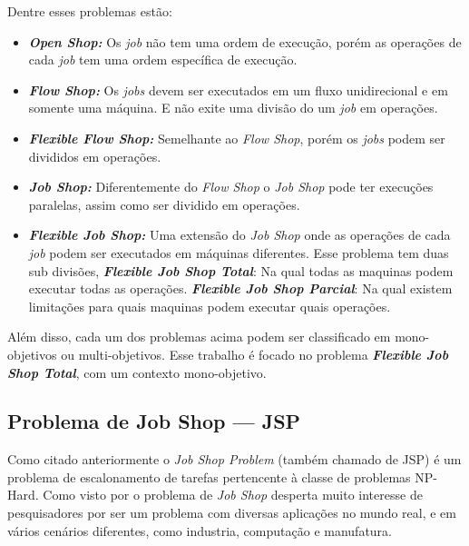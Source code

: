         \noindent Dentre esses problemas estão:
        \begin{itemize}
            \item \textbf{\textit{Open Shop:}} Os \textit{job} não tem uma ordem de execução, porém as operações de cada \textit{job} tem uma ordem específica de execução.
            
            \item \textbf{\textit{Flow Shop:}} Os \textit{jobs} devem ser executados em um fluxo unidirecional e em somente uma máquina. E não exite uma divisão do um \textit{job} em operações.
            
            \item \textbf{\textit{Flexible Flow Shop:}} Semelhante ao \textit{Flow Shop}, porém os \textit{jobs} podem ser divididos em operações.
            
            \item \textbf{\textit{Job Shop:}} Diferentemente do \textit{Flow Shop} o \textit{Job Shop} pode ter execuções paralelas, assim como ser dividido em operações.
            
            \item \textbf{\textit{Flexible Job Shop:}} Uma extensão do \textit{Job Shop} onde as operações de cada \textit{job} podem ser executados em máquinas diferentes. Esse problema tem duas sub divisões, 
            \subitem \textbf{\textit{Flexible Job Shop Total}}: Na qual todas as maquinas podem executar todas as operações. 
            \subitem \textbf{\textit{Flexible Job Shop Parcial}}: Na qual existem limitações para quais maquinas podem executar quais operações.
        \end{itemize}

        Além disso, cada um dos problemas acima podem ser classificado em mono-objetivos ou multi-objetivos. Esse trabalho é focado no problema \textbf{\textit{Flexible Job Shop Total}}, com um contexto mono-objetivo.\hfill\vspace{\onelineskip}
        


    \subsection{Problema de Job Shop — JSP}
            Como citado anteriormente o \textit{Job Shop Problem} (também chamado de JSP) é um problema de escalonamento de tarefas pertencente à classe de problemas NP-Hard. Como visto por \cite{Cheng1996} o problema de \textit{Job Shop} desperta muito interesse de pesquisadores por ser um problema com diversas aplicações no mundo real, e em vários cenários diferentes, como industria, computação e manufatura.\hfill\vspace{\onelineskip}

